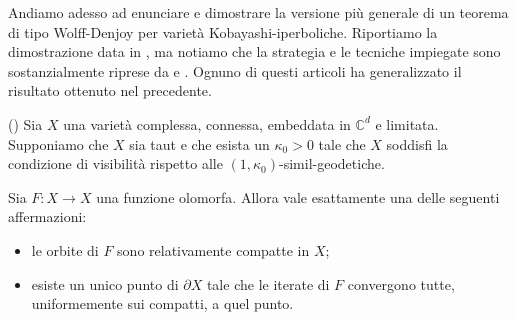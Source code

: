 Andiamo adesso ad enunciare e dimostrare la versione più generale di un teorema di tipo Wolff-Denjoy per varietà Kobayashi-iperboliche. Riportiamo la dimostrazione data in \cite{CMS}, ma notiamo che la strategia e le tecniche impiegate sono sostanzialmente riprese da \cite{BZ1} e \cite{BM}. Ognuno di questi articoli ha generalizzato il risultato ottenuto nel precedente.

\begin{thm} \label{wd_type}
    (\cite[Theorem 1.15]{CMS}) Sia $X$ una varietà complessa, connessa, embeddata in $\mathbb{C}^d$ e limitata. Supponiamo che $X$ sia taut e che esista un $\kappa_0>0$ tale che $X$ soddisfi la condizione di visibilità rispetto alle $(1,\kappa_0)$-simil-geodetiche.
    
    Sia $F:X \longrightarrow X$ una funzione olomorfa. Allora vale esattamente una delle seguenti affermazioni:
    \begin{itemize}
        \item le orbite di $F$ sono relativamente compatte in $X$;
        \item esiste un unico punto di $\partial X$ tale che le iterate di $F$ convergono tutte, uniformemente sui compatti, a quel punto.
    \end{itemize}
\end{thm}

